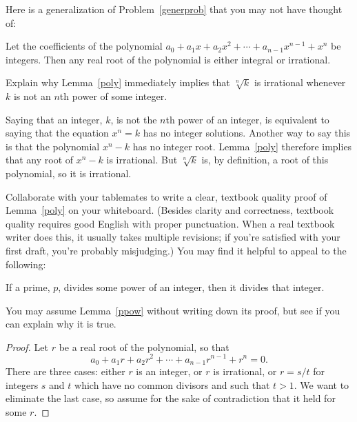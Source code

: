 \documentclass[handout]{mcs}
\begin{document}
\begin{problem}
  Here is a generalization of Problem~\ref{generprob} that you may not have
  thought of:

\begin{lemma}\label{poly}
Let the coefficients of the polynomial
$a_0+a_1x+a_2x^2+\cdots + a_{n-1}x^{n-1} + x^n$ be
integers.  Then any real root of the polynomial is either integral or
irrational.
\end{lemma}

\bparts

\ppart Explain why Lemma~\eqref{poly} immediately implies that
$\sqrt[n]{k}$ is irrational whenever $k$ is not an $n$th power of some integer.

\begin{solution}
Saying that an integer, $k$, is not the $n$th power of an
  integer, is equivalent to saying that the equation $x^n = k$ has no
  integer solutions.  Another way to say this is that the polynomial $x^n
  - k$ has no integer root.  Lemma~\eqref{poly} therefore implies that any
  root of $x^n-k$ is irrational.  But $\sqrt[n]{k}$ is, by definition, a
  root of this polynomial, so it is irrational.
\end{solution}

\ppart Collaborate with your tablemates to write a clear, textbook quality
proof of Lemma~\ref{poly} on your whiteboard.  (Besides clarity and
correctness, textbook quality requires good English with proper
punctuation.  When a real textbook writer does this, it usually takes
multiple revisions; if you're satisfied with your first draft, you're
probably misjudging.)  You may find it helpful to appeal to the following:
\begin{lemma}\label{ppow}
If a prime, $p$, divides some power of an integer, then it divides that
integer.
\end{lemma}
You may assume Lemma~\ref{ppow} without writing down its proof, but see if
you can explain why it is true.

\begin{solution}

\begin{proof}

Let $r$ be a real root of the polynomial, so that
\[
a_0+a_1r+a_2r^2+\cdots+  a_{n-1}r^{n-1}+ r^n = 0.
\]
There are three cases: either $r$ is an integer, or $r$ is irrational, or
$r = s/t$ for integers $s$ and $t$ which have no common divisors and such
that $t >1$.  We want to eliminate the last case, so assume for the sake
of contradiction that it held for some $r$.


\end{proof}
\end{solution}
\end{problem}
\end{document}
